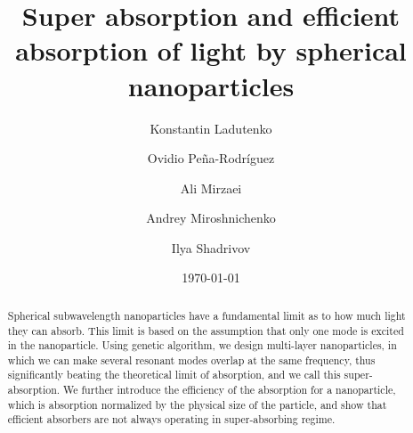 \documentclass[aps,prl,twocolumn,showpacs,superscriptaddress,groupedaddress]{revtex4-1}
\begin{document}

\title{Super absorption and efficient absorption of light by spherical
  nanoparticles}


\author{Konstantin Ladutenko} 


\author{Ovidio Pe\~{n}a-Rodr\'{i}guez} 


\author{Ali Mirzaei} \author{Andrey Miroshnichenko} \author{Ilya
  Shadrivov} 

\date{\today}

\begin{abstract}
  Spherical subwavelength nanoparticles have a fundamental limit as to
  how much light they can absorb. This limit is based on the
  assumption that only one mode is excited in the nanoparticle. Using
  genetic algorithm, we design multi-layer nanoparticles, in which we
  can make several resonant modes overlap at the same frequency, thus
  significantly beating the theoretical limit of absorption, and we
  call this super-absorption. We further introduce the efficiency of
  the absorption for a nanoparticle, which is absorption normalized by
  the physical size of the particle, and show that efficient absorbers
  are not always operating in super-absorbing regime.
\end{abstract}
\end{document}

